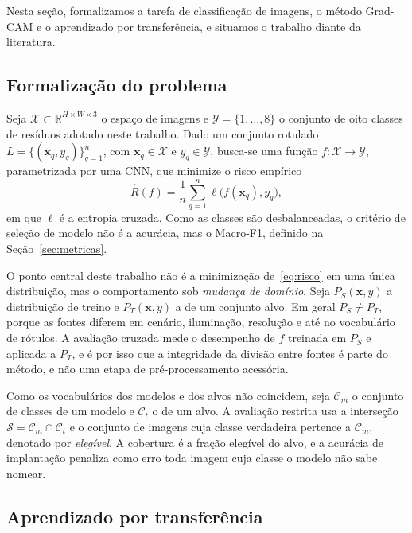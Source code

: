 \documentclass[11pt,a4paper]{article}
\begin{document}
	Nesta seção, formalizamos a tarefa de classificação de imagens, o método Grad-CAM e o aprendizado por transferência, e situamos o trabalho diante da literatura.
	
	\subsection{Formalização do problema}
	
	Seja $\mathcal{X} \subset \mathbb{R}^{H \times W \times 3}$ o espaço de imagens e $\mathcal{Y} = \{1, \dots, 8\}$ o conjunto de oito classes de resíduos adotado neste trabalho. Dado um conjunto rotulado $L = \{(\mathbf{x}_q, y_q)\}_{q=1}^{n}$, com $\mathbf{x}_q \in \mathcal{X}$ e $y_q \in \mathcal{Y}$, busca-se uma função $f : \mathcal{X} \rightarrow \mathcal{Y}$, parametrizada por uma CNN, que minimize o risco empírico
	\begin{equation}
		\hat{R}(f) = \frac{1}{n} \sum_{q=1}^{n} \ell\big(f(\mathbf{x}_q), y_q\big),
		\label{eq:risco}
	\end{equation}
	em que $\ell$ é a entropia cruzada. Como as classes são desbalanceadas, o critério de seleção de modelo não é a acurácia, mas o Macro-F1, definido na Seção~\ref{sec:metricas}.
	
	O ponto central deste trabalho não é a minimização de~\eqref{eq:risco} em uma única distribuição, mas o comportamento sob \emph{mudança de domínio}. Seja $P_S(\mathbf{x}, y)$ a distribuição de treino e $P_T(\mathbf{x}, y)$ a de um conjunto alvo. Em geral $P_S \neq P_T$, porque as fontes diferem em cenário, iluminação, resolução e até no vocabulário de rótulos. A avaliação cruzada mede o desempenho de $f$ treinada em $P_S$ e aplicada a $P_T$, e é por isso que a integridade da divisão entre fontes é parte do método, e não uma etapa de pré-processamento acessória.
	
	Como os vocabulários dos modelos e dos alvos não coincidem, seja $\mathcal{C}_m$ o conjunto de classes de um modelo e $\mathcal{C}_t$ o de um alvo. A avaliação restrita usa a interseção $\mathcal{S} = \mathcal{C}_m \cap \mathcal{C}_t$ e o conjunto de imagens cuja classe verdadeira pertence a $\mathcal{C}_m$, denotado por \emph{elegível}. A cobertura é a fração elegível do alvo, e a acurácia de implantação penaliza como erro toda imagem cuja classe o modelo não sabe nomear.
	
	\subsection{Aprendizado por transferência}
	
\end{document}
